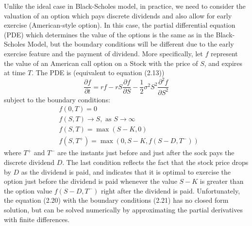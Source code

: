 \documentclass[11pt]{book}
\begin{document}
Unlike the ideal case in Black-Scholes model, in practice, we need
to consider the valuation of an option which pays discrete dividends
and also allow for early exercise (American-style option). In this
case, the partial differential equation (PDE) which determines the
value of the options is the same as in the Black-Scholes Model, but
the boundary conditions will be different due to the early exercise
feature and the payment of dividend. More specifically, let $f$
represent the value of an American call option on a Stock with the
price of $S$, and expires at time $T$. The PDE is (equivalent to
equation (2.13))
\begin{equation}
\frac{\partial f}{\partial t}=rf-rS \frac{\partial f}{\partial S} -
\frac{1}{2}\sigma^2 S^2\frac{\partial^2 f}{\partial S^2}
\end{equation}
subject to the boundary conditions:
\begin{equation}
\begin{split}
& f(0,T)=0 \\
& f(S,T)\rightarrow S, \text{ as } S\rightarrow \infty  \\
& f(S,T)=\max(S-K,0)\\
& f(S,T^+)=\max(0, S-K, f(S-D,T^-))
\end{split}
\end{equation}
where $T^+$ and $T^-$ are the instants just before and just after
the sock pays the discrete dividend $D$. The last condition reflects
the fact that the stock price drops by $D$ as the dividend is paid,
and indicates that it is optimal to exercise the option just before
the dividend is paid whenever the value $S-K$ is greater than the
option value $f(S-D,T^-)$ right after the dividend is paid.
Unfortunately, the equation (2.20) with the boundary conditions
(2.21) has no closed form solution, but can be solved numerically by
approximating the partial derivatives with finite differences.
\end{document}
